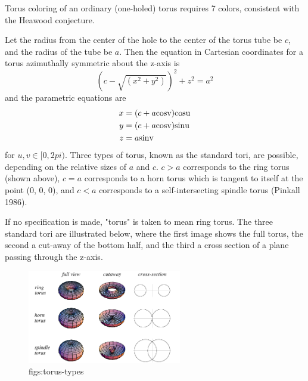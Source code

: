 \documentclass[lang=en,11pt,a4paper,cite=numbers]{elegantpaper}
\begin{document}
  Torus coloring of an ordinary (one-holed) torus requires 7 colors, consistent with the Heawood conjecture.

  Let the radius from the center of the hole to the center of the torus tube be $c$, and the radius of the tube be $a$. Then the equation in Cartesian coordinates for a torus azimuthally symmetric about the z-axis is
\begin{equation}
   \left(c-\sqrt{(x^{2}+y^{2})}\right)^{2}+z^{2}=a^{2} 
\end{equation}
and the parametric equations are
\begin{equation}
  \begin{aligned}
    x&=(c+a\rm{cos}v)\rm{cos}u\\
    y&=(c+a\rm{cos}v)\rm{sin}u\\
    z&=a\rm{sin}v
  \end{aligned}
\end{equation}
for $u,v \in [0,2pi)$. Three types of torus, known as the standard tori, are possible, depending on the relative sizes of $a$ and $c$. $c>a$ corresponds to the ring torus (shown above), $c=a$ corresponds to a horn torus which is tangent to itself at the point (0, 0, 0), and $c<a$ corresponds to a self-intersecting spindle torus (Pinkall 1986).

  If no specification is made, "torus" is taken to mean ring torus. The three standard tori are illustrated below, where the first image shows the full torus, the second a cut-away of the bottom half, and the third a cross section of a plane passing through the z-axis.
\begin{figure}[!htb]
  \centering
  \includegraphics[width=0.6\textwidth]{figs/torus-types.png}
  \caption{figs:torus-types}
  \label{figs:torus-types}
\end{figure}
\end{document}
